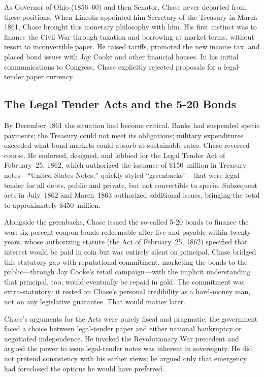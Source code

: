 \documentclass[12pt]{article}
\begin{document}
As Governor of Ohio (1856--60) and then Senator, Chase never departed
from these positions.  When Lincoln appointed him Secretary of the
Treasury in March 1861, Chase brought this monetary philosophy with him.
His first instinct was to finance the Civil War through taxation and
borrowing at market terms, without resort to inconvertible paper.  He
raised tariffs, promoted the new income tax, and placed bond issues
with Jay Cooke and other financial houses.  In his initial
communications to Congress, Chase explicitly rejected proposals for a
legal-tender paper currency.

\subsection{The Legal Tender Acts and the 5-20 Bonds}

By December 1861 the situation had become critical.  Banks had
suspended specie payments; the Treasury could not meet its obligations;
military expenditures exceeded what bond markets could absorb at
sustainable rates.  Chase reversed course.
He endorsed, designed, and lobbied for the Legal Tender Act
of February~25, 1862, which authorized the issuance of \$150~million in
Treasury notes---``United States Notes,'' quickly styled
``greenbacks''---that were legal tender for all debts, public and
private, but not convertible to specie.  Subsequent acts in July~1862
and March~1863 authorized additional issues, bringing the total to
approximately \$450~million.

Alongside the greenbacks, Chase issued the so-called 5-20 bonds to
finance the war: six-percent coupon bonds redeemable after five and
payable within twenty years, whose authorizing statute (the Act of
February~25, 1862) specified that interest would be paid in coin but
was entirely silent on principal.  Chase bridged this statutory gap with
reputational commitment, marketing the bonds to the public---through Jay
Cooke's retail campaign---with the implicit understanding that
principal, too, would eventually be repaid in gold.  The commitment was
extra-statutory: it rested on Chase's personal credibility as a
hard-money man, not on any legislative guarantee.  That would matter later.

Chase's arguments for the Acts were purely fiscal and pragmatic:
the government faced a choice between legal-tender paper and either
national bankruptcy or negotiated independence.  He invoked the
Revolutionary War precedent and argued the power to issue legal-tender
notes was inherent in sovereignty.  He did not pretend consistency with
his earlier views; he argued only that emergency had foreclosed the
options he would have preferred.
\end{document}
